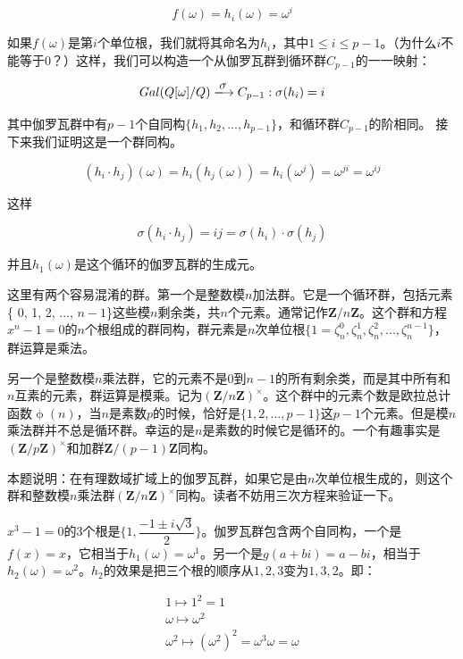 \documentclass[UTF8]{article}
\begin{document}
\begin{enumerate}
\[
f(\omega) = h_i(\omega) = \omega^{i}
\]

如果$f(\omega)$是第$i$个单位根，我们就将其命名为$h_i$，其中$1 \leq i \leq p-1$。（为什么$i$不能等于0？）这样，我们可以构造一个从伽罗瓦群到循环群$C_{p-1}$的一一映射：

\[
Gal(Q[\omega]/Q) \arrowto{\sigma} C_{p-1} :  \sigma(h_i) = i
\]

其中伽罗瓦群中有$p-1$个自同构$\{h_1, h_2, ..., h_{p-1}\}$，和循环群$C_{p-1}$的阶相同。
接下来我们证明这是一个群同构。

\[
(h_i \cdot h_j)(\omega) = h_i(h_j(\omega)) = h_i(\omega^j) = \omega^{ji} = \omega^{ij}
\]

这样

\[
\sigma(h_i \cdot h_j) = ij = \sigma(h_i) \cdot \sigma(h_j)
\]

并且$h_1(\omega)$是这个循环的伽罗瓦群的生成元。

\begin{mdframed}
这里有两个容易混淆的群。第一个是整数模$n$加法群。它是一个循环群，包括元素\{ 0, 1, 2, ..., $n - 1$\}这些模$n$剩余类，共$n$个元素。通常记作$\pmb{Z}/n\pmb{Z}$。这个群和方程$x^n - 1 = 0$的$n$个根组成的群同构，群元素是$n$次单位根$\{1 = \zeta_n^0, \zeta_n^1, \zeta_n^2, ..., \zeta_n^{n-1}\}$，群运算是乘法。

\vspace{5mm}

另一个是整数模$n$乘法群，它的元素不是0到$n-1$的所有剩余类，而是其中所有和$n$互素的元素，群运算是模乘。记为$(\pmb{Z}/n\pmb{Z})^{\times}$。这个群中的元素个数是欧拉总计函数$\upphi(n)$，当$n$是素数$p$的时候，恰好是$\{1, 2, ..., p-1\}$这$p-1$个元素。但是模$n$乘法群并不总是循环群。幸运的是$n$是素数的时候它是循环的。一个有趣事实是$(\pmb{Z}/p\pmb{Z})^{\times}$和加群$\pmb{Z}/(p-1)\pmb{Z}$同构。

\vspace{5mm}

本题说明：在有理数域扩域上的伽罗瓦群，如果它是由$n$次单位根生成的，则这个群和整数模$n$乘法群$(\pmb{Z}/n\pmb{Z})^{\times}$同构。读者不妨用三次方程来验证一下。

$x^3 - 1 = 0$的3个根是$\{1, \dfrac{-1 \pm i \sqrt{3}}{2}\}$。伽罗瓦群包含两个自同构，一个是$f(x) = x$，它相当于$h_1(\omega) = \omega^1$。另一个是$g(a + bi) = a - bi$，相当于$h_2(\omega) = \omega^2$。$h_2$的效果是把三个根的顺序从$1, 2, 3$变为$1, 3, 2$。即：

\[
\begin{array}{l}
1 \mapsto 1^2 = 1 \\
\omega \mapsto \omega^2 \\
\omega^2 \mapsto (\omega^2)^2 = \omega^3 \omega = \omega \\
\end{array}
\]


\end{mdframed}
\end{enumerate}
\end{document}
